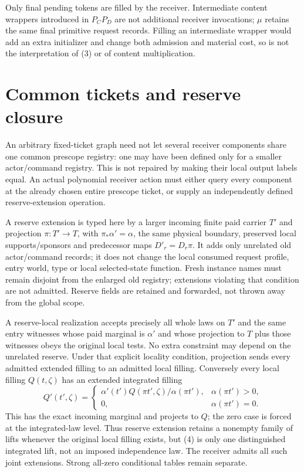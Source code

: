 \documentclass[11pt]{article}
\begin{document}
Only final pending tokens are filled by the receiver. Intermediate content wrappers introduced in $P_C P_D$ are not additional receiver invocations; $\mu$ retains the same final primitive request records. Filling an intermediate wrapper would add an extra initializer and change both admission and material cost, so is not the interpretation of (3) or of content multiplication.

\section{Common tickets and reserve closure}
An arbitrary fixed-ticket graph need not let several receiver components share one common prescope registry: one may have been defined only for a smaller actor/command registry. This is not repaired by making their local output labels equal. An actual polynomial receiver action must either query every component at the already chosen entire prescope ticket, or supply an independently defined reserve-extension operation.

A reserve extension is typed here by a larger incoming finite paid carrier $T'$ and projection $\pi:T'\to T$, with $\pi_*\alpha'=\alpha$, the same physical boundary, preserved local supports/sponsors and predecessor maps $D'_r=D_r\pi$. It adds only unrelated old actor/command records; it does not change the local consumed request profile, entry world, type or local selected-state function. Fresh instance names must remain disjoint from the enlarged old registry; extensions violating that condition are not admitted. Reserve fields are retained and forwarded, not thrown away from the global scope.

A reserve-local realization accepts precisely all whole laws on $T'$ and the same entry witnesses whose paid marginal is $\alpha'$ and whose projection to $T$ plus those witnesses obeys the original local tests. No extra constraint may depend on the unrelated reserve. Under that explicit locality condition, projection sends every admitted extended filling to an admitted local filling. Conversely every local filling $Q(t,\zeta)$ has an extended integrated filling
\[
 Q'(t',\zeta)=
 \begin{cases}
 \alpha'(t')Q(\pi t',\zeta)/\alpha(\pi t'),&\alpha(\pi t')>0,\\
 0,&\alpha(\pi t')=0.
 \end{cases}                                           \tag{4}
\]
This has the exact incoming marginal and projects to $Q$; the zero case is forced at the integrated-law level. Thus reserve extension retains a nonempty family of lifts whenever the original local filling exists, but (4) is only one distinguished integrated lift, not an imposed independence law. The receiver admits all such joint extensions. Strong all-zero conditional tables remain separate.
\end{document}
